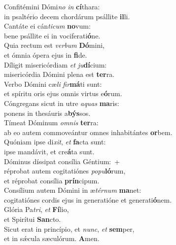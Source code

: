 \evenverse Confitémini Dómi\textit{no} \textit{in} \textbf{cí}thara:~\*\\
\evenverse in psaltério decem chordárum psállite \textbf{il}li.\\
\oddverse Cantáte ei cán\textit{ti}\textit{cum} \textbf{no}vum:~\*\\
\oddverse bene psállite ei in vociferati\textbf{ó}ne.\\
\evenverse Quia rectum est \textit{ver}\textit{bum} \textbf{Dó}mini,~\*\\
\evenverse et ómnia ópera ejus in \textbf{fi}de.\\
\oddverse Díligit misericórdiam \textit{et} \textit{ju}\textbf{dí}cium:~\*\\
\oddverse misericórdia Dómini plena est \textbf{ter}ra.\\
\evenverse Verbo Dómini cæ\textit{li} \textit{fir}\textbf{má}ti sunt:~\*\\
\evenverse et spíritu oris ejus omnis virtus e\textbf{ó}rum.\\
\oddverse Cóngregans sicut in utre \textit{a}\textit{quas} \textbf{ma}ris:~\*\\
\oddverse ponens in thesáuris a\textbf{býs}sos.\\
\evenverse Tímeat Dóminum \textit{om}\textit{nis} \textbf{ter}ra:~\*\\
\evenverse ab eo autem commoveántur omnes inhabitántes \textbf{or}bem.\\
\oddverse Quóniam ipse di\textit{xit}, \textit{et} \textbf{fa}cta sunt:~\*\\
\oddverse ipse mandávit, et cre\textbf{á}ta sunt.\\
\evenverse Dóminus díssipat consília Géntium:~+\\
\evenverse  réprobat autem cogitatiónes \textit{po}\textit{pu}\textbf{ló}rum,~\*\\
\evenverse et réprobat consília \textbf{prín}cipum.\\
\oddverse Consílium autem Dómini in æ\textit{tér}\textit{num} \textbf{ma}net:~\*\\
\oddverse cogitatiónes cordis ejus in generatióne et generati\textbf{ó}nem.\\
\evenverse Glória Pa\textit{tri}, \textit{et} \textbf{Fí}lio,~\*\\
\evenverse et Spirítui \textbf{San}cto.\\
\oddverse Sicut erat in princípio, et \textit{nunc}, \textit{et} \textbf{sem}per,~\*\\
\oddverse et in sǽcula sæculórum. \textbf{A}men.\\
